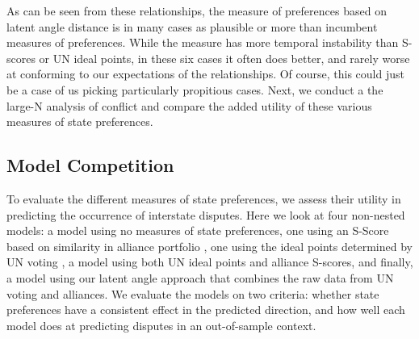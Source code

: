 

As can be seen from these relationships, the measure of preferences based on latent angle distance is in many cases as plausible or more than incumbent measures of preferences. While the measure has more temporal instability than S-scores or UN ideal points, in these six cases it often does better, and rarely worse at conforming to our expectations of the relationships. Of course, this could just be a case of us picking particularly propitious cases. Next, we conduct a the large-N analysis of conflict and compare the added utility of these various measures of state preferences.

\subsection*{Model Competition}

To evaluate the different measures of state preferences, we assess their utility in predicting the occurrence of interstate disputes. Here we look at four non-nested models: a model using no measures of state preferences, one using an S-Score based on similarity in alliance portfolio \citep{signorino:ritter:1999}, one using the ideal points determined by UN voting \citep{bailey:etal:2015}, a model using both UN ideal points and alliance S-scores, and finally, a model using our latent angle approach that combines the raw data from UN voting and alliances. We evaluate the models on two criteria: whether state preferences have a consistent effect in the predicted direction, and how well each model does at predicting disputes in an out-of-sample context.

